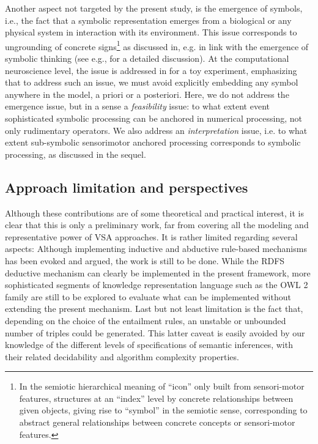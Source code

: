 \documentclass[sn-mathphys]{sn-jnl}
\begin{document}
Another aspect not targeted by the present study, is the emergence of symbols, i.e., the fact that a symbolic representation emerges from a biological or any physical system in interaction with its environment. This issue corresponds to ungrounding of concrete signs\footnote{In the semiotic hierarchical meaning of ``icon'' only built from sensori-motor features, structures at an ``index'' level by concrete relationships between given objects, giving rise to ``symbol'' in the semiotic sense, corresponding to abstract general relationships between concrete concepts or sensori-motor features.} as discussed in, e.g. \cite{raczaszek-leonardi_ungrounding_2018} in link with the emergence of symbolic thinking (see e.g., \cite{villiers_why_2007} for a detailed discussion). At the computational neuroscience level, the issue is addressed in \cite{rougier_implicit_2009} for a toy experiment, emphasizing that to address such an issue, we must avoid explicitly embedding any symbol anywhere in the model, a priori or a posteriori. Here, we do not address the emergence issue, but in a sense a {\em feasibility} issue: to what extent event sophisticated symbolic processing can be anchored in numerical processing, not only rudimentary operators. We also address an {\em interpretation} issue, i.e. to what extent sub-symbolic sensorimotor anchored processing corresponds to symbolic processing, as discussed in the sequel.

\subsection{Approach limitation and perspectives}

Although these contributions are of some theoretical and practical interest, it is clear that this is only a preliminary work, far from covering all the modeling and representative power of VSA approaches. It is rather limited regarding several aspects: Although implementing inductive and abductive rule-based mechanisms has been evoked and argued, the work is still to be done. While the RDFS deductive mechanism can clearly be implemented in the present framework, more sophisticated segments of knowledge representation language such as the OWL 2 family are still to be explored to evaluate what can be implemented without extending the present mechanism. Last but not least limitation is the fact that, depending on the choice of the entailment rules, an unstable or unbounded number of triples could be generated. This latter caveat is easily avoided by our knowledge of the different levels of specifications of semantic inferences, with their related decidability and algorithm complexity properties.
\end{document}
